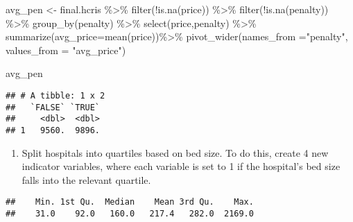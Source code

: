 \documentclass[
]{article}
\newenvironment{Shaded}{\begin{snugshade}}{\end{snugshade}}
\newcommand{\AttributeTok}[1]{\textcolor[rgb]{0.77,0.63,0.00}{#1}}
\newcommand{\FunctionTok}[1]{\textcolor[rgb]{0.00,0.00,0.00}{#1}}
\newcommand{\NormalTok}[1]{#1}
\newcommand{\OtherTok}[1]{\textcolor[rgb]{0.56,0.35,0.01}{#1}}
\newcommand{\SpecialCharTok}[1]{\textcolor[rgb]{0.00,0.00,0.00}{#1}}
\newcommand{\StringTok}[1]{\textcolor[rgb]{0.31,0.60,0.02}{#1}}
\providecommand{\tightlist}{%
  \setlength{\itemsep}{0pt}\setlength{\parskip}{0pt}}
\begin{document}
\begin{Shaded}
\begin{Highlighting}[]
\NormalTok{avg\_pen }\OtherTok{\textless{}{-}}\NormalTok{ final.hcris }\SpecialCharTok{\%\textgreater{}\%}
 \FunctionTok{filter}\NormalTok{(}\SpecialCharTok{!}\FunctionTok{is.na}\NormalTok{(price)) }\SpecialCharTok{\%\textgreater{}\%}
  \FunctionTok{filter}\NormalTok{(}\SpecialCharTok{!}\FunctionTok{is.na}\NormalTok{(penalty)) }\SpecialCharTok{\%\textgreater{}\%}
  \FunctionTok{group\_by}\NormalTok{(penalty) }\SpecialCharTok{\%\textgreater{}\%}
  \FunctionTok{select}\NormalTok{(price,penalty) }\SpecialCharTok{\%\textgreater{}\%}
  \FunctionTok{summarize}\NormalTok{(}\AttributeTok{avg\_price=}\FunctionTok{mean}\NormalTok{(price))}\SpecialCharTok{\%\textgreater{}\%}
  \FunctionTok{pivot\_wider}\NormalTok{(}\AttributeTok{names\_from =}\StringTok{"penalty"}\NormalTok{, }\AttributeTok{values\_from =} \StringTok{"avg\_price"}\NormalTok{)}

\NormalTok{avg\_pen}
\end{Highlighting}
\end{Shaded}

\begin{verbatim}
## # A tibble: 1 x 2
##   `FALSE` `TRUE`
##     <dbl>  <dbl>
## 1   9560.  9896.
\end{verbatim}

\begin{enumerate}
\def\labelenumi{\arabic{enumi}.}
\setcounter{enumi}{1}
\tightlist
\item
  Split hospitals into quartiles based on bed size. To do this, create 4
  new indicator variables, where each variable is set to 1 if the
  hospital's bed size falls into the relevant quartile.
\end{enumerate}

\begin{Shaded}
\end{Shaded}

\begin{verbatim}
##    Min. 1st Qu.  Median    Mean 3rd Qu.    Max. 
##    31.0    92.0   160.0   217.4   282.0  2169.0
\end{verbatim}
\end{document}
